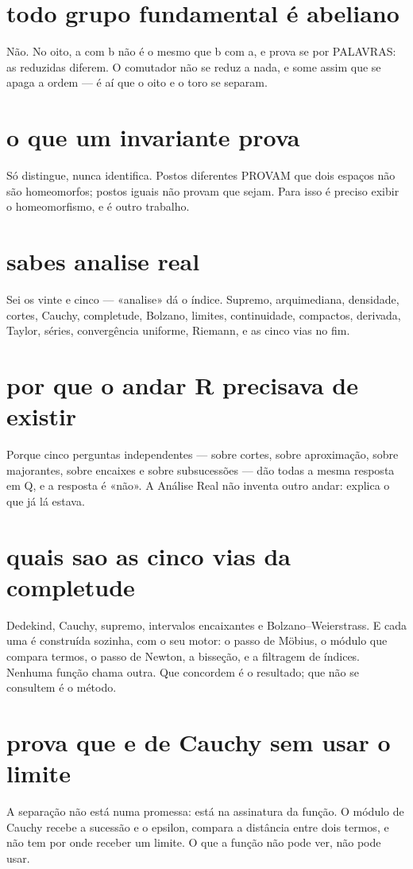 \documentclass[11pt,a4paper]{article}
\begin{document}
\section{todo grupo fundamental é abeliano}
Não. No oito, a com b não é o mesmo que b com a, e prova se por PALAVRAS: as reduzidas
diferem. O comutador não se reduz a nada, e some assim que se apaga a ordem — é aí que o
oito e o toro se separam.

\section{o que um invariante prova}
Só distingue, nunca identifica. Postos diferentes PROVAM que dois espaços não são
homeomorfos; postos iguais não provam que sejam. Para isso é preciso exibir o
homeomorfismo, e é outro trabalho.

\section{sabes analise real}
Sei os vinte e cinco — «analise» dá o índice. Supremo, arquimediana, densidade, cortes,
Cauchy, completude, Bolzano, limites, continuidade, compactos, derivada, Taylor, séries,
convergência uniforme, Riemann, e as cinco vias no fim.

\section{por que o andar R precisava de existir}
Porque cinco perguntas independentes — sobre cortes, sobre aproximação, sobre majorantes,
sobre encaixes e sobre subsucessões — dão todas a mesma resposta em Q, e a resposta é
«não». A Análise Real não inventa outro andar: explica o que já lá estava.

\section{quais sao as cinco vias da completude}
Dedekind, Cauchy, supremo, intervalos encaixantes e Bolzano--Weierstrass. E cada uma é
construída sozinha, com o seu motor: o passo de Möbius, o módulo que compara termos, o
passo de Newton, a bisseção, e a filtragem de índices. Nenhuma função chama outra. Que
concordem é o resultado; que não se consultem é o método.

\section{prova que e de Cauchy sem usar o limite}
A separação não está numa promessa: está na assinatura da função. O módulo de Cauchy
recebe a sucessão e o epsilon, compara a distância entre dois termos, e não tem por onde
receber um limite. O que a função não pode ver, não pode usar.
\end{document}
